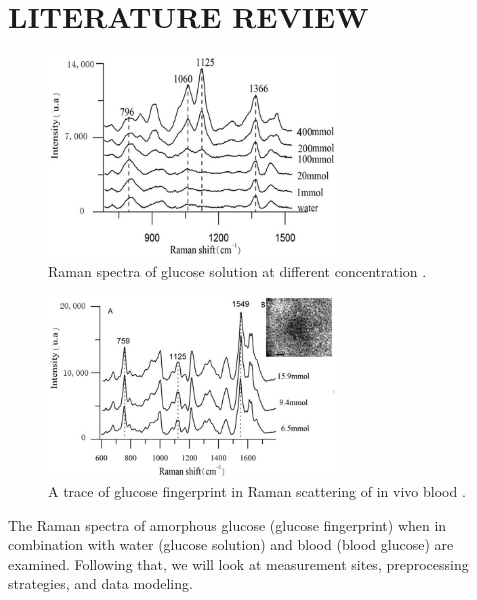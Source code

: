 \setlength{\footskip}{8mm}

\chapter{LITERATURE REVIEW}

\begin{figure}
    \caption{Raman spectra of glucose solution at different concentration \citep{solutionGlucose}.}
    \centerline{\includegraphics[width=3in]{figures/solutionGlucose-RS.jpeg}} \label{fig:solutionGlucose-RS}
\end{figure}

\begin{figure}
    \caption{A trace of glucose fingerprint in Raman scattering of in vivo blood \citep{solutionGlucose}.}
    \centerline{\includegraphics[width=3in]{figures/bloodGlucose-RS-2012.jpeg}}\label{fig:bloodGlucose-relative1125}
\end{figure}

The Raman spectra of amorphous glucose (glucose fingerprint) when in combination with water (glucose solution) and blood (blood glucose) are examined. Following that, we will look at measurement sites, preprocessing strategies, and data modeling.
\\
